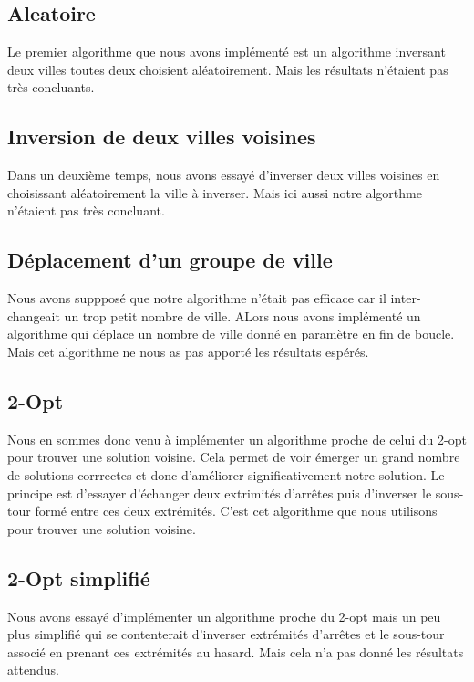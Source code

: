 \documentclass{article}
\begin{document}
\subsection{Aleatoire}

Le premier algorithme que nous avons implémenté est un algorithme inversant deux villes toutes deux choisient aléatoirement. Mais les résultats n'étaient pas très concluants.

\subsection{Inversion de deux villes voisines}

Dans un deuxième temps, nous avons essayé d'inverser deux villes voisines en choisissant aléatoirement la ville à inverser. Mais ici aussi notre algorthme n'étaient pas très concluant.

\subsection{Déplacement d'un groupe de ville}

Nous avons suppposé que notre algorithme n'était pas efficace car il inter-changeait un trop petit nombre de ville. ALors nous avons implémenté un algorithme qui déplace un nombre de ville donné en paramètre en fin de boucle. Mais cet algorithme ne nous as pas apporté les résultats espérés.

\subsection{2-Opt}

Nous en sommes donc venu à implémenter un algorithme proche de celui du 2-opt pour trouver une solution voisine. Cela permet de voir émerger un grand nombre de solutions corrrectes et donc d'améliorer significativement notre solution. Le principe est d'essayer d'échanger deux extrimités d'arrêtes puis d'inverser le sous-tour formé entre ces deux extrémités. C'est cet algorithme que nous utilisons pour trouver une solution voisine.

\subsection{2-Opt simplifié}

Nous avons essayé d'implémenter un algorithme proche du 2-opt mais un peu plus simplifié qui se contenterait d'inverser extrémités d'arrêtes et le sous-tour associé en prenant ces extrémités au hasard. Mais cela n'a pas donné les résultats attendus.
\end{document}
